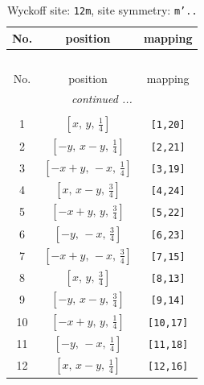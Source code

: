 \documentclass[fleqn,8pt]{jsarticle}
\begin{document}
\begin{longtable}{ccc}
\caption{Wyckoff site: {\tt 12m}, site symmetry: {\tt m'..}}
 \\
 \hline \hline
No. & position & mapping \\ \hline \endfirsthead

\multicolumn{2}{l}{\tablename\ \thetable{}} \\
 \hline \hline
No. & position & mapping \\ \hline \endhead

 \hline \hline
\multicolumn{2}{r}{\footnotesize\it continued ...} \\ \endfoot

 \hline \hline
\multicolumn{2}{r}{} \\ \endlastfoot

1 & $\left[ x,\, y,\, \frac{1}{4} \right]$ & {\tt [1,20]} \\ \hline
2 & $\left[ - y,\, x - y,\, \frac{1}{4} \right]$ & {\tt [2,21]} \\ \hline
3 & $\left[ - x + y,\, - x,\, \frac{1}{4} \right]$ & {\tt [3,19]} \\ \hline
4 & $\left[ x,\, x - y,\, \frac{3}{4} \right]$ & {\tt [4,24]} \\ \hline
5 & $\left[ - x + y,\, y,\, \frac{3}{4} \right]$ & {\tt [5,22]} \\ \hline
6 & $\left[ - y,\, - x,\, \frac{3}{4} \right]$ & {\tt [6,23]} \\ \hline
7 & $\left[ - x + y,\, - x,\, \frac{3}{4} \right]$ & {\tt [7,15]} \\ \hline
8 & $\left[ x,\, y,\, \frac{3}{4} \right]$ & {\tt [8,13]} \\ \hline
9 & $\left[ - y,\, x - y,\, \frac{3}{4} \right]$ & {\tt [9,14]} \\ \hline
10 & $\left[ - x + y,\, y,\, \frac{1}{4} \right]$ & {\tt [10,17]} \\ \hline
11 & $\left[ - y,\, - x,\, \frac{1}{4} \right]$ & {\tt [11,18]} \\ \hline
12 & $\left[ x,\, x - y,\, \frac{1}{4} \right]$ & {\tt [12,16]} \\
\end{longtable}
\renewcommand{\arraystretch}{1.2}
\end{document}
